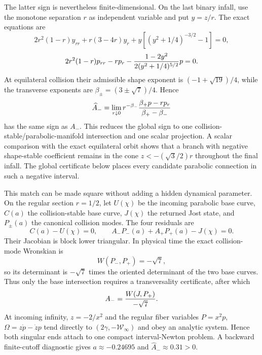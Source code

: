 \documentclass[11pt]{article}
\begin{document}
The latter sign is nevertheless finite-dimensional. On the last binary
infall, use the monotone separation $r$ as independent variable and put
$y=z/r$. The exact equations are
\[
 2r^2(1-r)y_{rr}+r(3-4r)y_r
 +y[(y^2+1/4)^{-3/2}-1]=0,
\]
\[
 2r^2(1-r)p_{rr}-rp_r
 -{1-2y^2\over2(y^2+1/4)^{5/2}}p=0.
\]
At equilateral collision their admissible shape exponent is
$(-1+\sqrt{19})/4$, while the transverse exponents are
$\beta_\pm=(3\pm\sqrt7)/4$. Hence
\[
 \widehat A_-=\lim_{r\downarrow0}r^{-\beta_-}
 {\beta_+p-rp_r\over\beta_+-\beta_-}
\]
has the same sign as $A_-$. This reduces the global sign to one
collision-stable/parabolic-manifold intersection and one scalar projection.
A scalar comparison with the exact equilateral orbit shows that a branch with
negative shape-stable coefficient remains in the cone
$z<-(\sqrt3/2)r$ throughout the final infall. The global certificate below
places every candidate parabolic connection in such a negative interval.

This match can be made square without adding a hidden dynamical parameter.
On the regular section $r=1/2$, let $U(\chi)$ be the incoming parabolic base
curve, $C(a)$ the collision-stable base curve, $J(\chi)$ the returned Jost
state, and $P_\pm(a)$ the canonical collision modes. The four residuals are
\[
 C(a)-U(\chi)=0,
 \qquad A_-P_-(a)+A_+P_+(a)-J(\chi)=0.
\]
Their Jacobian is block lower triangular. In physical time the exact
collision-mode Wronskian is
\[
 W(P_-,P_+)=-\sqrt7,
\]
so its determinant is $-\sqrt7$ times the oriented determinant of the two
base curves. Thus only the base intersection requires a transversality
certificate, after which
\[
 A_-={W(J,P_+)\over-\sqrt7}.
\]
At incoming infinity, $z=-2/x^2$ and the regular fiber variables
$P=x^2p$, $\Omega=z\dot p-\dot zp$ tend directly to
$(2\gamma,-\mathcal W_\infty)$ and obey an analytic system. Hence both
singular ends attach to one compact interval-Newton problem. A backward
finite-cutoff diagnostic gives $a\approx-0.24695$ and
$\widehat A_-\approx0.31>0$.
\end{document}
